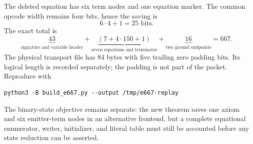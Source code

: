 The deleted equation has six term nodes and one equation marker.  The
common opcode width remains four bits, hence the saving is
\[
                         6\cdot4+1=25\text{ bits}.
\]
The exact total is
\[
 \underbrace{43}_{\text{signature and variable header}}
 +\underbrace{(7+4\cdot150+1)}_{\text{seven equations and terminator}}
 +\underbrace{16}_{\text{two ground endpoints}}
 =667.
\]
The physical transport file has 84 bytes with five trailing zero padding
bits.  Its logical length is recorded separately; the padding is not part
of the packet.  Reproduce with
\begin{verbatim}
python3 -B build_e667.py --output /tmp/e667-replay
\end{verbatim}

The binary-state objective remains separate: the new theorem saves one
axiom and six emitter-term nodes in an alternative frontend, but a complete
equational enumerator, writer, initializer, and literal table must still be
accounted before any state reduction can be asserted.
